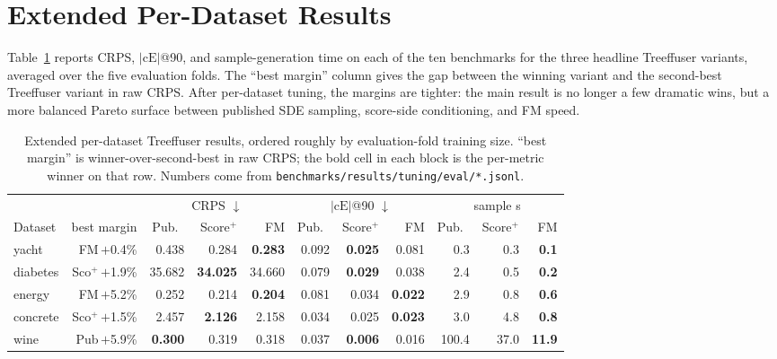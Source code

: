 \documentclass{tpm2026}
\begin{document}
\section{Extended Per-Dataset Results}\label{app:perdata-ext}

Table~\ref{tab:perdata-ext} reports CRPS, $|\text{cE}|$@90, and sample-generation time on each of the ten benchmarks for the three headline Treeffuser variants, averaged over the five evaluation folds. The ``best margin'' column gives the gap between the winning variant and the second-best Treeffuser variant in raw CRPS. After per-dataset tuning, the margins are tighter: the main result is no longer a few dramatic wins, but a more balanced Pareto surface between published SDE sampling, score-side conditioning, and FM speed.

\begin{table}[!h]
  \centering
  \caption{Extended per-dataset Treeffuser results, ordered roughly by evaluation-fold training size. ``best margin'' is winner-over-second-best in raw CRPS; the bold cell in each block is the per-metric winner on that row. Numbers come from \texttt{benchmarks/results/tuning/eval/*.jsonl}.}\label{tab:perdata-ext}
  \scriptsize
  \begin{tabular}{lrrrrrrrrrr}
    \toprule
    & & \multicolumn{3}{c}{CRPS $\downarrow$} & \multicolumn{3}{c}{$|\text{cE}|$@90 $\downarrow$} & \multicolumn{3}{c}{sample s} \\
    \cmidrule(lr){3-5} \cmidrule(lr){6-8} \cmidrule(lr){9-11}
    Dataset & best margin & Pub.\ & Score$^+$ & FM & Pub.\ & Score$^+$ & FM & Pub.\ & Score$^+$ & FM \\
    \midrule
    yacht              & FM\,$+$0.4\%      & 0.438 & 0.284 & \textbf{0.283} & 0.092 & \textbf{0.025} & 0.081 & 0.3 & 0.3 & \textbf{0.1} \\
    diabetes           & Sco$^+$\,$+$1.9\% & 35.682 & \textbf{34.025} & 34.660 & 0.079 & \textbf{0.029} & 0.038 & 2.4 & 0.5 & \textbf{0.2} \\
    energy             & FM\,$+$5.2\%      & 0.252 & 0.214 & \textbf{0.204} & 0.081 & 0.034 & \textbf{0.022} & 2.9 & 0.8 & \textbf{0.6} \\
    concrete           & Sco$^+$\,$+$1.5\% & 2.457 & \textbf{2.126} & 2.158 & 0.034 & 0.025 & \textbf{0.023} & 3.0 & 4.8 & \textbf{0.8} \\
    wine               & Pub\,$+$5.9\%     & \textbf{0.300} & 0.319 & 0.318 & 0.037 & \textbf{0.006} & 0.016 & 100.4 & 37.0 & \textbf{11.9} \\

\end{tabular}
\end{table}
\end{document}
